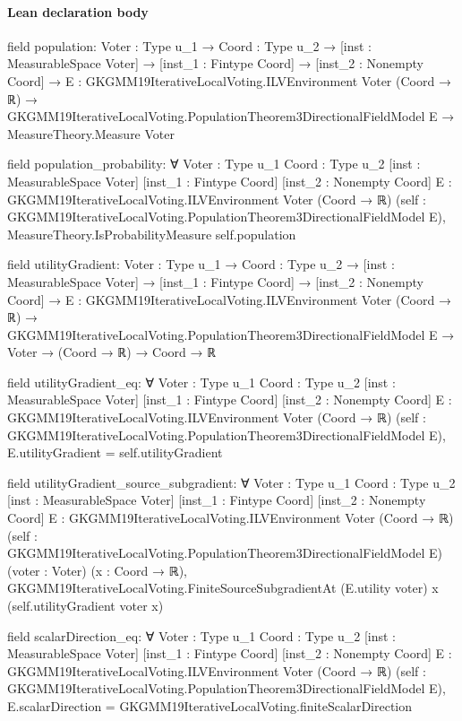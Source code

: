 \documentclass[10pt]{article}
\begin{document}
\paragraph{Lean declaration body}
\begin{ReviewVerbatim}
field population:
{Voter : Type u_1} →
  {Coord : Type u_2} →
    [inst : MeasurableSpace Voter] →
      [inst_1 : Fintype Coord] →
        [inst_2 : Nonempty Coord] →
          {E : GKGMM19IterativeLocalVoting.ILVEnvironment Voter (Coord → ℝ)} →
            GKGMM19IterativeLocalVoting.PopulationTheorem3DirectionalFieldModel E → MeasureTheory.Measure Voter

field population_probability:
∀ {Voter : Type u_1} {Coord : Type u_2} [inst : MeasurableSpace Voter] [inst_1 : Fintype Coord]
  [inst_2 : Nonempty Coord] {E : GKGMM19IterativeLocalVoting.ILVEnvironment Voter (Coord → ℝ)}
  (self : GKGMM19IterativeLocalVoting.PopulationTheorem3DirectionalFieldModel E),
  MeasureTheory.IsProbabilityMeasure self.population

field utilityGradient:
{Voter : Type u_1} →
  {Coord : Type u_2} →
    [inst : MeasurableSpace Voter] →
      [inst_1 : Fintype Coord] →
        [inst_2 : Nonempty Coord] →
          {E : GKGMM19IterativeLocalVoting.ILVEnvironment Voter (Coord → ℝ)} →
            GKGMM19IterativeLocalVoting.PopulationTheorem3DirectionalFieldModel E → Voter → (Coord → ℝ) → Coord → ℝ

field utilityGradient_eq:
∀ {Voter : Type u_1} {Coord : Type u_2} [inst : MeasurableSpace Voter] [inst_1 : Fintype Coord]
  [inst_2 : Nonempty Coord] {E : GKGMM19IterativeLocalVoting.ILVEnvironment Voter (Coord → ℝ)}
  (self : GKGMM19IterativeLocalVoting.PopulationTheorem3DirectionalFieldModel E),
  E.utilityGradient = self.utilityGradient

field utilityGradient_source_subgradient:
∀ {Voter : Type u_1} {Coord : Type u_2} [inst : MeasurableSpace Voter] [inst_1 : Fintype Coord]
  [inst_2 : Nonempty Coord] {E : GKGMM19IterativeLocalVoting.ILVEnvironment Voter (Coord → ℝ)}
  (self : GKGMM19IterativeLocalVoting.PopulationTheorem3DirectionalFieldModel E) (voter : Voter) (x : Coord → ℝ),
  GKGMM19IterativeLocalVoting.FiniteSourceSubgradientAt (E.utility voter) x (self.utilityGradient voter x)

field scalarDirection_eq:
∀ {Voter : Type u_1} {Coord : Type u_2} [inst : MeasurableSpace Voter] [inst_1 : Fintype Coord]
  [inst_2 : Nonempty Coord] {E : GKGMM19IterativeLocalVoting.ILVEnvironment Voter (Coord → ℝ)}
  (self : GKGMM19IterativeLocalVoting.PopulationTheorem3DirectionalFieldModel E),
  E.scalarDirection = GKGMM19IterativeLocalVoting.finiteScalarDirection


\end{ReviewVerbatim}
\end{document}
